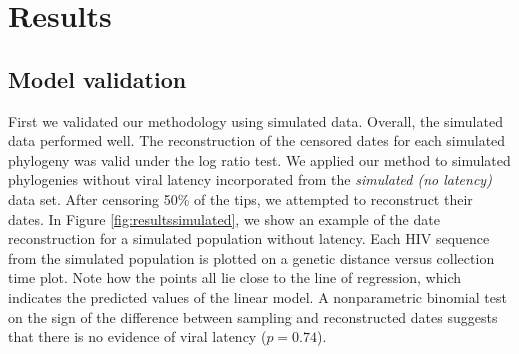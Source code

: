 \documentclass[12pt]{article}
\begin{document}



\section * {Results} \label{sec:results}


\subsection * {Model validation} \label{sec:sim_results}
First we validated our methodology using simulated data.
Overall, the simulated data performed well. The reconstruction of the censored dates for each simulated phylogeny was valid under the log ratio test.
We applied our method to simulated phylogenies without viral latency incorporated from the \emph{simulated (no latency)} data set.
After censoring 50\% of the tips, we attempted to reconstruct their dates.
In Figure \ref{fig:resultssimulated}, we show an example of the date reconstruction for a simulated population without latency.
Each HIV sequence from the simulated population is plotted on a genetic distance versus collection time plot.
Note how the points all lie close to the line of regression, which indicates the predicted values of the linear model.
A nonparametric binomial test on the sign of the difference between sampling and reconstructed dates suggests that there is no evidence of viral latency ($p = 0.74$).
\end{document}
